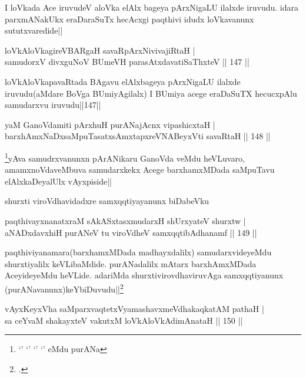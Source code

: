 \begin{artha}
I loVkada Ace iruvudeV aloVka elAlx bageya pArxNigaLU ilalxde iruvudu. idara parxmANakUkx eraDaraSuTx hecAcxgi paqthivi idudx loVkavanunx sututxvaredide||
\end{artha}

\begin{shl}
loVkAloVkagireVBARgaH savaRpArxNivivajiRtaH |\\
samudorxV divxguNoV BUmeVH parasAtxdavatiSaThxteV \hfill || 147 ||
\end{shl}

\begin{artha}
loVkAloVkapavaRtada BAgavu elAlxbageya pArxNigaLU ilalxde iruvudu(aMdare BoVga BUmiyAgilalx) I BUmiya acege eraDaSuTX hecucxpAlu samudarxvu iruvudu||147||
\end{artha}

\begin{shl}
yaM GanoVdamiti pArxhuH purANajAcnx vipashicxtaH |\\
barxhAmxNaDxsaMpuTasatxsAmxtapxreVNABeyxVti savaRtaH \hfill || 148 ||
\end{shl}

\begin{artha}
\footnote{`\stext' `\stext' `\stext' `\stext' eMdu purANa}yAva samudrxvanunxn pArANikaru GanoVda veMdu heVLuvaro, amamxnoVdaveMbuva samudarxkekx Acege barxhamxMDada saMpuTavu elAlxkaDeyalUlx vAyxpiside||
\end{artha}

\begin{artha}
shurxti viroVdhavidadxre samxqqtiyayanunx biDabeVku
\end{artha}

\begin{shl}
paqthivayxnanatxraM sAkASxtasxmudarxH shUrxyateV shurxtw |\\
aNADxdavxhiH purANeV tu viroVdheV samxqqtibAdhanamf \hfill || 149 ||
\end{shl}

\begin{artha}
paqthiviyanamara(barxhamxMDada madhayxdalilx) samudarxvideyeMdu shurxtiyalilx keVLibaMdide. purANadalilx mAtarx barxhAmxMDada AceyideyeMdu heVLide. adariMda shurxtivirovdhaviruvAga samxqqtiyanunx (purANavanunx)keYbiDuvudu||\footnote{\stext. \stext \stext \stext}
\end{artha}

\begin{shl}
vAyxKeyxVha saMparxvaqtetxVyamashavxmeVdhakaqkatAM pathaH |\\
sa ceYvaM shakayxteV vakutxM loVkAloVkAdimAnataH \hfill || 150 ||
\end{shl}

